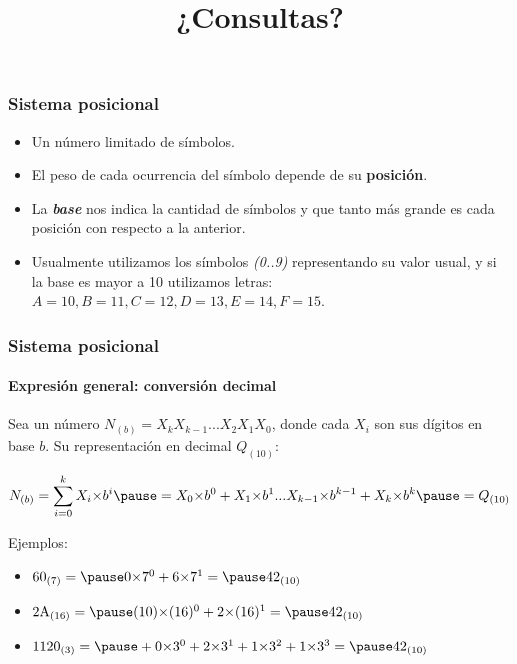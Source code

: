 \documentclass[11pt,a4paper,spanish]{beamer}
\begin{document}
\begin{frame}

\frametitle{Sistema posicional}

\begin{itemize}
    \item Un número limitado de símbolos.
    \item El peso de cada ocurrencia del símbolo depende de su
        \textbf{posición}.
    \item La \textbf{\emph{base}} nos indica la cantidad de símbolos y que
        tanto más grande es cada posición con respecto a la anterior.
    \item Usualmente utilizamos los símbolos \emph{(0..9)} representando su
        valor usual, y si la base es mayor a 10 utilizamos letras: $ A=10,
        B=11, C=12, D=13, E=14, F=15$.
\end{itemize}

\end{frame}

\begin{frame}

\frametitle{Sistema posicional}
\framesubtitle{Expresión general: conversión decimal}

    Sea un número $N_{(b)} = X_{k}X_{k-1}...X_{2}X_{1}X_{0}$, donde cada $X_{i}$ son sus
    dígitos en base $b$. Su representación en decimal $Q_{(10)}$:

\begin{equation*}
    N_{(b)} = \displaystyle\sum_{i=0}^{k} X_{i}{\times}b^{i}
    \pause
    =
    X_{0}{\times}b^{0}+X_{1}{\times}b^{1}...
    X_{k-1}{\times}b^{k-1}+X_{k}{\times}b^{k}
    \pause
    = Q_{(10)}
\end{equation*}
\pause

Ejemplos:
\pause
\begin{itemize}
    \item
        $60_{(7)} = \pause
        0{\times}7^0+6{\times}7^1 = \pause
        42_{(10)}$\pause
    \item $\mathrm{2A}_{(16)} = \pause
        (10){\times}(16)^0+2{\times}(16)^1 = \pause
        42_{(10)}$\pause
    \item $1120_{(3)} = \pause
        +0{\times}3^0+2{\times}3^1+1{\times}3^2+1{\times}3^3 = \pause
        42_{(10)}$
\end{itemize}

\end{frame}

\begin{frame}

\title{¿Consultas?}
\maketitle

\end{frame}
\end{document}
